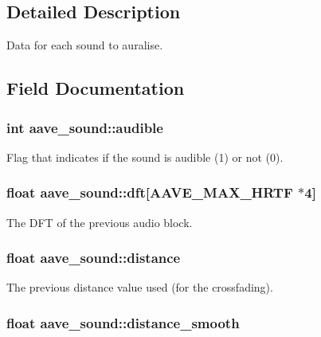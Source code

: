 \subsection{Detailed Description}
Data for each sound to auralise. 

\subsection{Field Documentation}
\hypertarget{structaave__sound_ad452524fd55cf2d6490a7a7b9a1c85b7}{
\subsubsection[{audible}]{\setlength{\rightskip}{0pt plus 5cm}int aave\-\_\-sound\-::audible}}\label{structaave__sound_ad452524fd55cf2d6490a7a7b9a1c85b7}
Flag that indicates if the sound is audible (1) or not (0). \hypertarget{structaave__sound_aa94c4070b91409c6cac4189fc599f6f9}{
\subsubsection[{dft}]{\setlength{\rightskip}{0pt plus 5cm}float aave\-\_\-sound\-::dft\mbox{[}{\bf A\-A\-V\-E\-\_\-\-M\-A\-X\-\_\-\-H\-R\-T\-F} $\ast$4\mbox{]}}}\label{structaave__sound_aa94c4070b91409c6cac4189fc599f6f9}
The D\-F\-T of the previous audio block. \hypertarget{structaave__sound_abefe2c52139bd0fcad1413d82ce1635e}{
\subsubsection[{distance}]{\setlength{\rightskip}{0pt plus 5cm}float aave\-\_\-sound\-::distance}}\label{structaave__sound_abefe2c52139bd0fcad1413d82ce1635e}
The previous distance value used (for the crossfading). \hypertarget{structaave__sound_a32919a754ba68db947c74eaadad979c2}{
\subsubsection[{distance\-\_\-smooth}]{\setlength{\rightskip}{0pt plus 5cm}float aave\-\_\-sound\-::distance\-\_\-smooth}}\label{structaave__sound_a32919a754ba68db947c74eaadad979c2}
